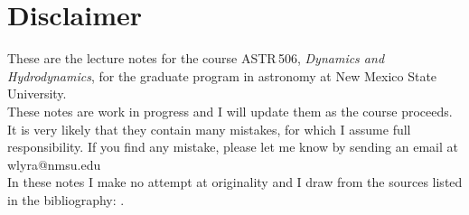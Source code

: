\chapter*{Disclaimer}

These are the lecture notes for the course ASTR\,506, {\it Dynamics and
  Hydrodynamics}, for the graduate program in astronomy
at New Mexico State University. \\

These notes are work in progress and I will update them as the course proceeds.
It is very likely that they contain many mistakes, for which I assume full responsibility. If you find any mistake, please let me know by sending an email at
wlyra@nmsu.edu\\

In these notes I make no attempt at originality and I draw from the
sources listed in the bibliography: \cite{vanBiezen,Kolecki,DullemondPeeters,Wheeler,Leishman,Sormani22,SpringelDullemond12,RegevUmurhan16,McDonough07}.
